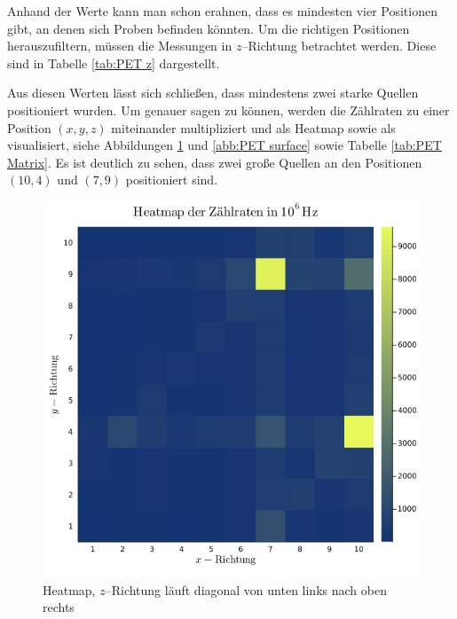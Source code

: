 \documentclass[12pt,a4paper]{scrartcl}
\numberwithin{equation}{section} %
\begin{document}
Anhand der Werte kann man schon erahnen, dass es mindesten vier Positionen gibt, an denen sich Proben befinden könnten. Um die richtigen Positionen herauszufiltern, müssen die Messungen in $z$--Richtung betrachtet werden. Diese sind in Tabelle \ref{tab:PET z} dargestellt.


Aus diesen Werten lässt sich schließen, dass mindestens zwei starke Quellen positioniert wurden. Um genauer sagen zu können, werden die Zählraten zu einer Position $(x,y,z)$ miteinander multipliziert und als Heatmap sowie als visualisiert, siehe Abbildungen \ref{abb:PET heatmap} und \ref{abb:PET surface} sowie Tabelle \ref{tab:PET Matrix}. Es ist deutlich zu sehen, dass zwei große Quellen an den Positionen $(10,4)$ und $(7,9)$ positioniert sind.

\begin{figure}[h!]
	\centering
	\begin{minipage}[t]{0.7\textwidth}
		\includegraphics[width=\textwidth]{../media/B3.4/heatmap.png}
		\caption{Heatmap, $z$--Richtung läuft diagonal von unten links nach oben rechts}
		\label{abb:PET heatmap}
	\end{minipage}


\end{figure}
\end{document}
